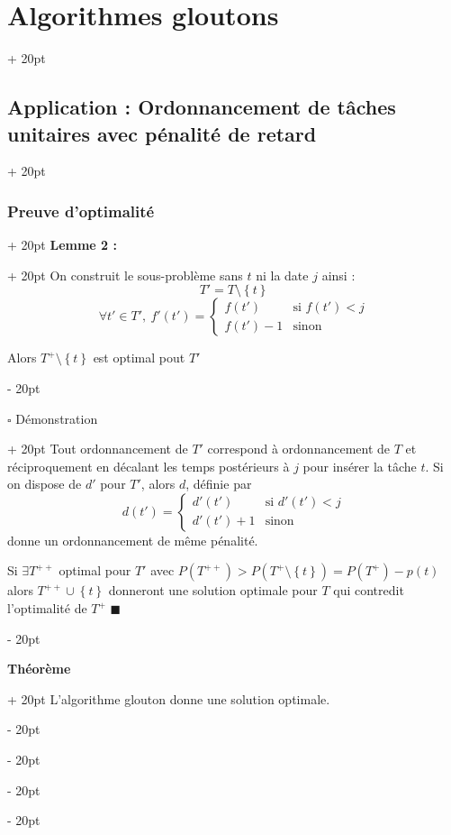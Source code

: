 \documentclass[a4paper, 12pt, twoside]{article}
\newcommand{\set}[1]{\left\{ #1 \right\}}
\newcommand{\ind}[1][20pt]{\advance\leftskip + #1}
\newcommand{\deind}[1][20pt]{\advance\leftskip - #1}
\newenvironment{indt}[2][20pt]{#2 \par \ind[#1]}{\par \deind} %
\begin{document}
\begin{indt}{\section{Algorithmes gloutons}}
\begin{indt}{\subsection{Application : Ordonnancement de tâches unitaires avec pénalité de retard}}
\begin{indt}{\subsubsection{Preuve d'optimalité}}
\begin{indt}{\textbf{Lemme 2 :}}
                    On construit le sous-problème sans $t$ ni la date $j$ ainsi :
                        \[ T' = T \setminus \set t \]
                        \[
                            \forall t' \in T',\ f'(t') =
                            \left\{\!\!
                            \begin{array}{ll}
                                f(t') & \text{si $f(t') < j$}
                                \\
                                f(t') - 1 & \text{sinon}
                            \end{array}
                            \right.
                        \]
                    
                    Alors $T^+ \setminus \set t$ est optimal pout $T'$
                \end{indt}
                
                \vspace{12pt}
                
                \begin{indt}{$\square$ Démonstration}
                    Tout ordonnancement de $T'$ correspond à ordonnancement de $T$ et réciproquement en décalant les temps postérieurs à $j$ pour insérer la tâche $t$. Si on dispose de $d'$ pour $T'$, alors $d$, définie par
                        \[
                            d(t') =
                            \left\{\!\!
                            \begin{array}{ll}
                                d'(t') & \text{si $d'(t') < j$}
                                \\
                                d'(t') + 1 & \text{sinon}
                            \end{array}
                            \right.
                        \]
                    donne un ordonnancement de même pénalité.
                    
                    Si $\exists T^{++}$ optimal pour $T'$ avec $P(T^{++}) > P(T^+ \setminus \set t) = P(T^+) - p(t)$
                    alors $T^{++} \cup \set t$ donneront une solution optimale pour $T$ qui contredit l'optimalité de $T^+$
                    $\blacksquare$
                \end{indt}
                
                \vspace{12pt}
                
                \begin{indt}{\textbf{Théorème}}
                    L'algorithme glouton donne une solution optimale.
                \end{indt}
                

\end{indt}
\end{indt}
\end{indt}
\end{document}
